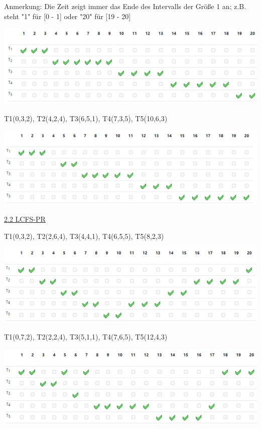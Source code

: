 \documentclass[fleqn]{article}
\begin{document}
Anmerkung: Die Zeit zeigt immer das Ende des Intervalls der Größe 1 an; z.B. steht "1" für [0 - 1] oder "20" für [19 - 20]

\begin{center}
    \includegraphics{4.png}
\end{center}

T1(0,3,2), T2(4,2,4), T3(6,5,1), T4(7,3,5), T5(10,6,3)

\begin{center}
    \includegraphics{5.png}
\end{center}

\noindent\uline{2.2 LCFS-PR}

T1(0,3,2), T2(2,6,4), T3(4,4,1), T4(6,5,5), T5(8,2,3)

\begin{center}
    \includegraphics{6.png}
\end{center}

T1(0,7,2), T2(2,2,4), T3(5,1,1), T4(7,6,5), T5(12,4,3)

\begin{center}
    \includegraphics{7.png}
\end{center}
\end{document}
